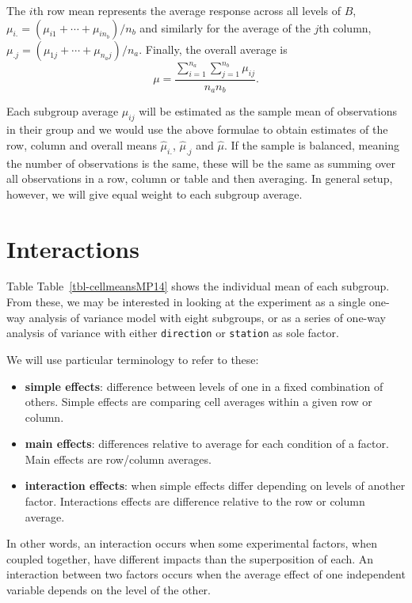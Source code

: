 \documentclass[
  11pt,
  letterpaper,
]{scrbook}
\providecommand{\tightlist}{%
  \setlength{\itemsep}{0pt}\setlength{\parskip}{0pt}}\usepackage{longtable,booktabs,array}
\theoremstyle{definition}
\theoremstyle{remark}
\begin{document}
The \(i\)th row mean represents the average response across all levels
of \(B\), \(\mu_{i.} = (\mu_{i1} + \cdots + \mu_{in_b})/n_b\) and
similarly for the average of the \(j\)th column,
\(\mu_{.j} = (\mu_{1j} + \cdots + \mu_{n_aj})/n_a.\) Finally, the
overall average is
\[\mu = \frac{\sum_{i=1}^{n_a} \sum_{j=1}^{n_b} \mu_{ij}}{n_an_b}.\]

Each subgroup average \(\mu_{ij}\) will be estimated as the sample mean
of observations in their group and we would use the above formulae to
obtain estimates of the row, column and overall means
\(\widehat{\mu}_{i.}\), \(\widehat{\mu}_{.j}\) and \(\widehat{\mu}\). If
the sample is balanced, meaning the number of observations is the same,
these will be the same as summing over all observations in a row, column
or table and then averaging. In general setup, however, we will give
equal weight to each subgroup average.

\hypertarget{interactions}{%
\section{Interactions}\label{interactions}}

Table Table~\ref{tbl-cellmeansMP14} shows the individual mean of each
subgroup. From these, we may be interested in looking at the experiment
as a single one-way analysis of variance model with eight subgroups, or
as a series of one-way analysis of variance with either
\texttt{direction} or \texttt{station} as sole factor.

We will use particular terminology to refer to these:

\begin{itemize}
\tightlist
\item
  \textbf{simple effects}: difference between levels of one in a fixed
  combination of others. Simple effects are comparing cell averages
  within a given row or column.
\item
  \textbf{main effects}: differences relative to average for each
  condition of a factor. Main effects are row/column averages.
\item
  \textbf{interaction effects}: when simple effects differ depending on
  levels of another factor. Interactions effects are difference relative
  to the row or column average.
\end{itemize}

In other words, an interaction occurs when some experimental factors,
when coupled together, have different impacts than the superposition of
each. An interaction between two factors occurs when the average effect
of one independent variable depends on the level of the other.
\end{document}
